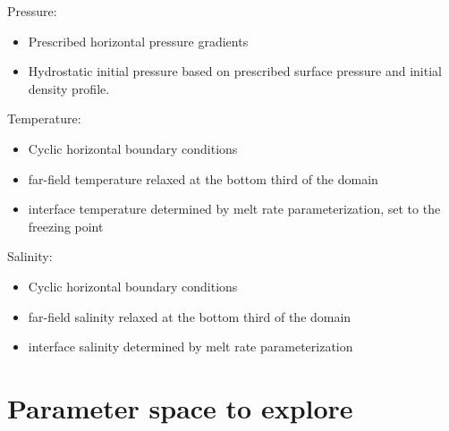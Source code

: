 \documentclass[letterpaper,10pt]{report}
\begin{document}
	Pressure:
	\begin{itemize}
	\item Prescribed horizontal pressure gradients
	\item Hydrostatic initial pressure based on prescribed surface pressure and initial density profile.
	\end{itemize}
	
	Temperature:
	\begin{itemize}
	    \item Cyclic horizontal boundary conditions
	    \item far-field temperature relaxed at the bottom third of the domain
	    \item interface temperature determined by melt rate parameterization, set to the freezing point
	\end{itemize}
	
	Salinity:
    \begin{itemize}
	    \item Cyclic horizontal boundary conditions
	    \item far-field salinity relaxed at the bottom third of the domain
	    \item interface salinity determined by melt rate parameterization
	\end{itemize}
	
	\newpage
	
	\section{Parameter space to explore}
	
\end{document}
